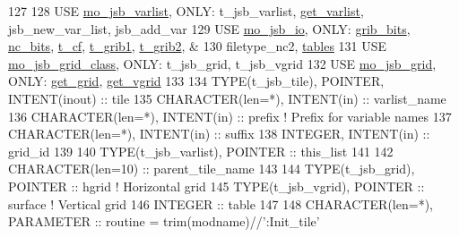 \begin{DoxyCode}
127 
128     \textcolor{keywordtype}{USE }\hyperlink{namespacemo__jsb__varlist}{mo\_jsb\_varlist}\textcolor{keywordtype}{,       ONLY}: t\_jsb\_varlist, \hyperlink{namespacemo__jsb__varlist_adb20739c60013ec241ba5044f198ce74}{get\_varlist}, jsb\_new\_var\_list, 
      jsb\_add\_var
129     \textcolor{keywordtype}{USE }\hyperlink{namespacemo__jsb__io}{mo\_jsb\_io}\textcolor{keywordtype}{,            ONLY}: \hyperlink{namespacemo__jsb__io_aade09fd070010f905e77497f041ce6c3}{grib\_bits}, \hyperlink{namespacemo__jsb__io_a4bf2b656fa0a7acf938f0bfcad5870e3}{nc\_bits}, 
      \hyperlink{structmo__jsb__io_1_1t__cf}{t\_cf}, \hyperlink{structmo__jsb__io_1_1t__grib1}{t\_grib1}, \hyperlink{structmo__jsb__io_1_1t__grib2}{t\_grib2}, &
130                                     filetype\_nc2, \hyperlink{namespacemo__jsb__io_aefd9f08b763f8c7b6f4cdbc576e3dd14}{tables}
131     \textcolor{keywordtype}{USE }\hyperlink{namespacemo__jsb__grid__class}{mo\_jsb\_grid\_class}\textcolor{keywordtype}{,    ONLY}: t\_jsb\_grid, t\_jsb\_vgrid
132     \textcolor{keywordtype}{USE }\hyperlink{namespacemo__jsb__grid}{mo\_jsb\_grid}\textcolor{keywordtype}{,          ONLY}: \hyperlink{namespacemo__jsb__grid_ad009e7ddbafe2ef26506e2a5abdeb4db}{get\_grid}, \hyperlink{namespacemo__jsb__grid_a2111791e291579cc1551a4213a670e35}{get\_vgrid}
133 
134     \textcolor{keywordtype}{TYPE}(t\_jsb\_tile),   \textcolor{keywordtype}{POINTER},  \textcolor{keywordtype}{INTENT(inout)} :: tile
135     \textcolor{keywordtype}{CHARACTER(len=*)},             \textcolor{keywordtype}{INTENT(in)}    :: varlist\_name
136     \textcolor{keywordtype}{CHARACTER(len=*)},             \textcolor{keywordtype}{INTENT(in)}    :: prefix        \textcolor{comment}{! Prefix for variable names}
137     \textcolor{keywordtype}{CHARACTER(len=*)},             \textcolor{keywordtype}{INTENT(in)}    :: suffix
138     \textcolor{keywordtype}{INTEGER},                      \textcolor{keywordtype}{INTENT(in)}    :: grid\_id
139 
140     \textcolor{keywordtype}{TYPE}(t\_jsb\_varlist), \textcolor{keywordtype}{POINTER} :: this\_list
141 
142     \textcolor{keywordtype}{CHARACTER(len=10)} :: parent\_tile\_name
143 
144     \textcolor{keywordtype}{TYPE}(t\_jsb\_grid),  \textcolor{keywordtype}{POINTER} :: hgrid                        \textcolor{comment}{! Horizontal grid}
145     \textcolor{keywordtype}{TYPE}(t\_jsb\_vgrid), \textcolor{keywordtype}{POINTER} :: surface                      \textcolor{comment}{! Vertical grid}
146     \textcolor{keywordtype}{INTEGER} :: table
147 
148     \textcolor{keywordtype}{CHARACTER(len=*)}, \textcolor{keywordtype}{PARAMETER} :: routine = trim(modname)//\textcolor{stringliteral}{':Init\_tile'}

\end{DoxyCode}

